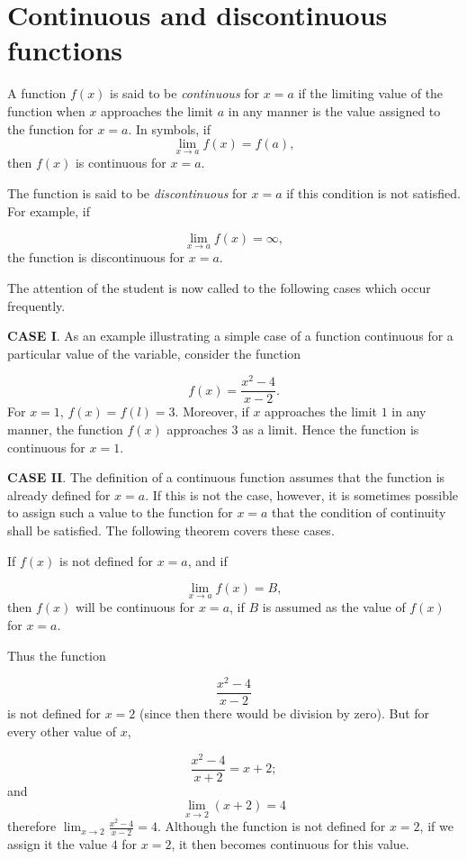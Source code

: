 \section{Continuous and discontinuous functions}
\label{sec:18}

A function $f(x)$ is said to be {\it continuous} for $x = a$ if 
the limiting value of the function when $x$ approaches the limit $a$ 
in any manner is the value assigned to the function for $x = a$. 
In symbols, if
\[
    \lim_{x \to a} f(x) = f(a),
\]
then $f(x)$ is continuous for $x = a$.

The function is said to be {\it discontinuous} for $x = a$ 
if this condition is not satisfied. For example, if

\[
    \lim_{x \to a} f(x) = \infty,
\]
the function is discontinuous for $x = a$.

The attention of the student is now called to the following cases 
which occur frequently.

\noindent
{\bf CASE I}. 
As an example illustrating a simple case of a function continuous 
for a particular value of the variable, consider the function

\[
    f(x) = \frac{x^2 - 4}{x - 2}.
\]
For $x = 1$, $f(x) = f(l) = 3$. Moreover, if $x$ approaches the limit 
$1$ in any manner, the function $f(x)$ approaches $3$ as a limit. 
Hence the function is continuous for $x = 1$.

\noindent
{\bf CASE II}. 
The definition of a continuous function assumes that the function 
is already defined for $x = a$. If this is not the case, however, 
it is sometimes possible to assign such a value to the function 
for $x = a$ that the condition of continuity shall be satisfied. 
The following theorem covers these cases.

\begin{theorem}
If $f(x)$ is not defined for $x = a$, and if

\[
    \lim_{x \to a} f(x) = B,
\]
then $f(x)$ will be continuous for $x = a$, if $B$ 
is assumed as the value of $f(x)$ for $x = a$. 
\end{theorem}

Thus the function

\[
    \frac{x^2 - 4}{x - 2}
\]
is not defined for $x = 2$ (since then there would be division by 
zero). But for every other value of $x$,

\[
    \frac{x^2 - 4}{x + 2} = x + 2;
\]
and 
\[
\lim_{x \to 2} (x + 2) 	= 4
\]
therefore $\lim_{x \to 2} \frac{x^2 - 4}{x - 2} 	= 4$.
Although the function is not defined for $x = 2$, if we %
assign it the value $4$ for $x = 2$, it then becomes continuous for this value.

